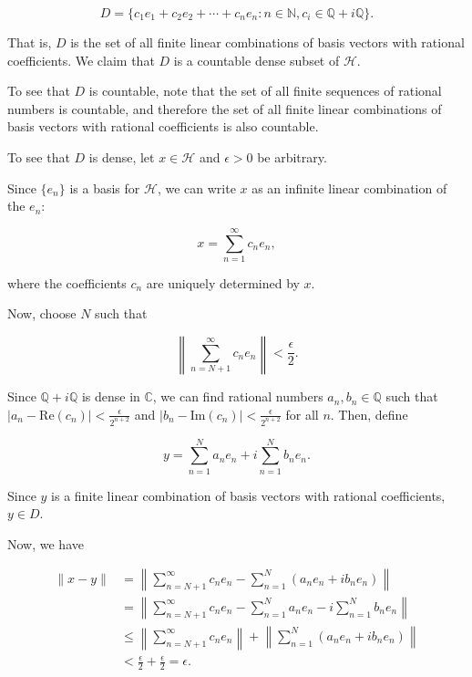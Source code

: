\documentclass[12pt, a4paper]{article} %
\begin{document}
        $$D = \{c_1 e_1 + c_2 e_2 + \cdots + c_n e_n : n \in \mathbb{N}, c_i \in \mathbb{Q} + i\mathbb{Q}\}.$$

       That is, $D$ is the set of all finite linear combinations of basis vectors with rational coefficients. We claim that $D$ is a countable dense subset of $\mathcal{H}$. 

       To see that $D$ is countable, note that the set of all finite sequences of rational numbers is countable, and therefore the set of all finite linear combinations of basis vectors with rational coefficients is also countable. 

       To see that $D$ is dense, let $x \in \mathcal{H}$ and $\epsilon > 0$ be arbitrary.  

       Since $\{e_n\}$ is a basis for $\mathcal{H}$, we can write $x$ as an infinite linear combination of the $e_n$:
       
       $$x = \sum_{n=1}^\infty c_n e_n,$$
       
       where the coefficients $c_n$ are uniquely determined by $x$. 
       
       Now, choose $N$ such that 
       
       $$\left\|\sum_{n=N+1}^\infty c_n e_n\right\| < \frac{\epsilon}{2}.$$ 
       
       Since $\mathbb{Q} + i\mathbb{Q}$ is dense in $\mathbb{C}$, we can find rational numbers $a_n, b_n \in \mathbb{Q}$ such that $|a_n - \text{Re}(c_n)| < \frac{\epsilon}{2^{n+2}}$ and $|b_n - \text{Im}(c_n)| < \frac{\epsilon}{2^{n+2}}$ for all $n$. Then, define 
       
       $$y = \sum_{n=1}^N a_n e_n + i\sum_{n=1}^N b_n e_n.$$ 
       
       Since $y$ is a finite linear combination of basis vectors with rational coefficients, $y \in D$. 
       
       Now, we have 
       
       \begin{align*}
       \|x-y\| &= \left\|\sum_{n=N+1}^\infty c_n e_n - \sum_{n=1}^N (a_n e_n + ib_n e_n)\right\| \\
       &= \left\|\sum_{n=N+1}^\infty c_n e_n - \sum_{n=1}^N a_n e_n - i\sum_{n=1}^N b_n e_n\right\| \\
       &\leq \left\|\sum_{n=N+1}^\infty c_n e_n\right\| + \left\|\sum_{n=1}^N (a_n e_n + ib_n e_n)\right\| \\
       &< \frac{\epsilon}{2} + \frac{\epsilon}{2} = \epsilon.
       \end{align*}
       
\end{document}
